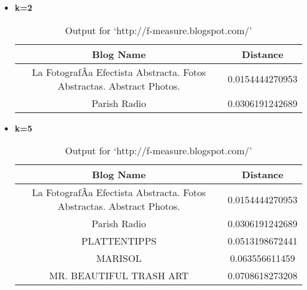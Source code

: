 \begin{itemize}
\item \textbf{ k=2}
\begin{table}
\caption{Output for `http://f-measure.blogspot.com/'}
\label{q1table1}
\begin{center}
\hspace{-2cm}
\begin{tabular}{|c|c|}
\hline
 \textbf{Blog Name} & \textbf{Distance}\\ \hline
La FotografÃ­a Efectista Abstracta. Fotos Abstractas. Abstract  Photos. & 0.0154444270953	 \\ \hline
Parish Radio &    0.0306191242689	  \\ \hline
\end{tabular}
\end{center}
\end{table}

\newpage
\item \textbf{ k=5}
\begin{table}
\caption{Output for `http://f-measure.blogspot.com/'}
\label{q1table1}
\begin{center}
\hspace{-2cm}
\begin{tabular}{|c|c|}
\hline
 \textbf{Blog Name} & \textbf{Distance}\\ \hline
La FotografÃ­a Efectista Abstracta. Fotos Abstractas. Abstract  Photos. & 0.0154444270953	 \\ \hline
Parish Radio &    0.0306191242689	  \\ \hline
PLATTENTIPPS &    0.0513198672441	  \\ \hline
MARISOL&  0.063556611459	  \\ \hline
MR. BEAUTIFUL TRASH ART & 0.0708618273208	  \\ \hline
\end{tabular}
\end{center}
\end{table}



\end{itemize}
